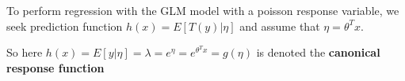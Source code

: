 %
%
\begin{answer}
To perform regression with the GLM model with a poisson response variable, we seek prediction function $h(x) = E[T(y) | \eta]$ and assume that $\eta = \theta^T x$.

So here $h(x) = E[y | \eta] = \lambda = e^\eta = e^{\theta^T x} = g(\eta)$ is denoted the \textbf{canonical response function}
\end{answer}
%